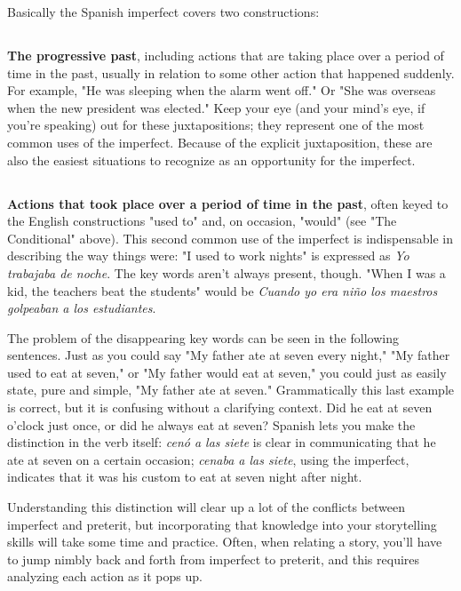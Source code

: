 \documentclass[14pt,a4paper,oneside]{memoir}
\begin{document}
Basically the Spanish imperfect covers two constructions:

\subsection{}

\textbf{The progressive past}, including actions that are taking
place over a period of time in the past, usually in relation to some
other action that happened suddenly. For example, "He was sleeping
when the alarm went off." Or "She was overseas when the new president was elected." Keep your eye (and your mind's eye, if you're speaking)
out for these juxtapositions; they represent one of the most common uses of the imperfect. Because of the explicit juxtaposition, these
are also the easiest situations to recognize as an opportunity for the
imperfect.

\subsection{}

\textbf{Actions that took place over a period of time in the past},
often keyed to the English constructions "used to" and, on occasion,
"would" (see "The Conditional" above). This second common use of
the imperfect is indispensable in describing the way things were: "I
used to work nights" is expressed as \emph{Yo trabajaba de noche}. The key
words aren't always present, though. "When I was a kid, the teachers
beat the students" would be \emph{Cuando yo era niño los maestros golpeaban a los estudiantes}.

The problem of the disappearing key words can be seen in the
following sentences. Just as you could say "My father ate at seven every night," "My father used to eat at seven," or "My father would eat
at seven," you could just as easily state, pure and simple, "My father
ate at seven." Grammatically this last example is correct, but it is confusing without a clarifying context. Did he eat at seven o'clock just
once, or did he always eat at seven? Spanish lets you make the distinction in the verb itself: \emph{cenó a las siete} is clear in communicating that
he ate at seven on a certain occasion; \emph{cenaba a las siete}, using the
imperfect, indicates that it was his custom to eat at seven night after
night.

Understanding this distinction will clear up a lot of the conflicts between imperfect and preterit, but incorporating that knowledge
into your storytelling skills will take some time and practice. Often,
when relating a story, you'll have to jump nimbly back and forth from
imperfect to preterit, and this requires analyzing each action as it
pops up.
\end{document}
